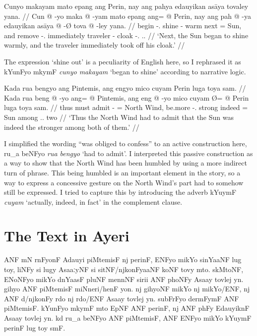 \documentclass[12pt,paper=a4]{scrartcl}
\newcommand{\xayr}[3]{{\Tagati #1} \emph{#2} \enquote*{#3}}
\newenvironment{ayeri}{
    \doublespacing
    \begin{multicols}{2}
    \Tagati
}{
    \end{multicols} \par
}
\begin{document}
\ex %
\begingl
	\glpreamble Cunyo makayam mato epang ang Perin, nay ang pahya edauyikan asāya tovaley yana. //
	\gla Cun @ -yo maka @ -yam mato epang ang= @ Perin, nay ang pah @ -ya edauyikan asāya @ -Ø tova @ -ley yana. //
	\glb begin -\Tsg{}.\N{} shine -\Ptcp{} warm next \Aarg{}= Sun, and \AgtT{} remove -\Tsg{}.\M{} immediately traveler -\Top{} cloak -\Parg{}.\Inan{} \Tsg{}.\M.\Gen{} //
	\glft `Next, the Sun began to shine warmly, and the traveler immediately took off his cloak.' //
\endgl
\xe

The expression `shine out' is a peculiarity of English here, so I rephrased it as \xayr{kYunFyo mkymF}{cunyo makayam}{began to shine} according to narrative logic.

\ex %
\begingl
	\glpreamble Kada rua bengyo ang Pintemis, ang engyo mico cuyam Perin luga toya sam. //
	\gla Kada rua beng @ -yo ang= @ Pintemis, ang eng @ -yo mico cuyam  Ø= @ Perin luga toya sam. //
	\glb thus must admit -\Tsg{} \Aarg{}= {North Wind}, \AgtT{} be.more -\Tsg{}.\N{} strong indeed \Top{}= Sun among \Tpl{}.\N{}.\Loc{} two //
	\glft `Thus the North Wind had to admit that the Sun was indeed the stronger among both of them.' //
\endgl
\xe

I simplified the wording \enquote{was obliged to confess} to an active construction here, \xayr{ru\_a beNFyo}{rua bengyo}{had to admit}. I interpreted this passive construction as a way to show that the North Wind has been humbled by using a more indirect turn of phrase. This being humbled is an important element in the story, so a way to express a concessive gesture on the North Wind's part had to somehow still be expressed. I tried to capture this by introducing the adverb \xayr{kYuymF}{cuyam}{actually, indeed, in fact} in the complement clause.

\section{The Text in Ayeri}

\begin{ayeri}
\noindent ANF mN rnFyonF Adauyi piMtemisF nj perinF, ENFyo mikYo sinYaaNF lug toy, liNFy si lugy AsaaːyNF si sitNF/njkonFyaaNF koNF tovy mto.
skMtoNF, ENoNFyo mikYo dnYaasF pluNF mennNF sirii ANF phoNFy Asaay tovlej yn.
gihyo ANF piM\-temisF miNneri/henF yon.
nj gihyoNF mikYo nj mikYo/ENF, nj ANF d/njkonFy rdo nj rdo/ENF Asaay tovlej yn.
subFrFyo dermFymF ANF piMtemisF.
kYunFyo mkymF mto EpNF ANF perinF, nj ANF phFy EdauyiknF Asaay tovlej yn.
kd ru\_a beNFyo ANF piMtemisF, ANF ENFyo mikYo kYuymF perinF lug toy smF.
\end{ayeri}
\end{document}
